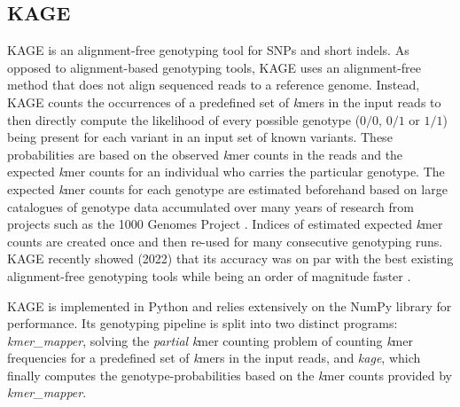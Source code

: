 \subsection{KAGE} \label{background:kage}
KAGE \cite{kage} is an alignment-free genotyping tool for SNPs and short indels.
As opposed to alignment-based genotyping tools, KAGE uses an alignment-free method that does not align sequenced reads to a reference genome.
Instead, KAGE counts the occurrences of a predefined set of \textit{k}mers in the input reads to then directly compute the likelihood of every possible genotype ($0/0$, $0/1$ or $1/1$) being present for each variant in an input set of known variants.
These probabilities are based on the observed \textit{k}mer counts in the reads and the expected \textit{k}mer counts for an individual who carries the particular genotype.
The expected \textit{k}mer counts for each genotype are estimated beforehand based on large catalogues of genotype data accumulated over many years of research from projects such as the 1000 Genomes Project \cite{1000_genomes_project}.
Indices of estimated expected \textit{k}mer counts are created once and then re-used for many consecutive genotyping runs.
KAGE recently showed (2022) that its accuracy was on par with the best existing alignment-free genotyping tools while being an order of magnitude faster \cite{kage}.

KAGE is implemented in Python and relies extensively on the NumPy library for performance.
Its genotyping pipeline is split into two distinct programs: \textit{kmer\_mapper}, solving the \textit{partial} \textit{k}mer counting problem of counting \textit{k}mer frequencies for a predefined set of \textit{k}mers in the input reads, and \textit{kage}, which finally computes the genotype-probabilities based on the \textit{k}mer counts provided by \textit{kmer\_mapper}.

